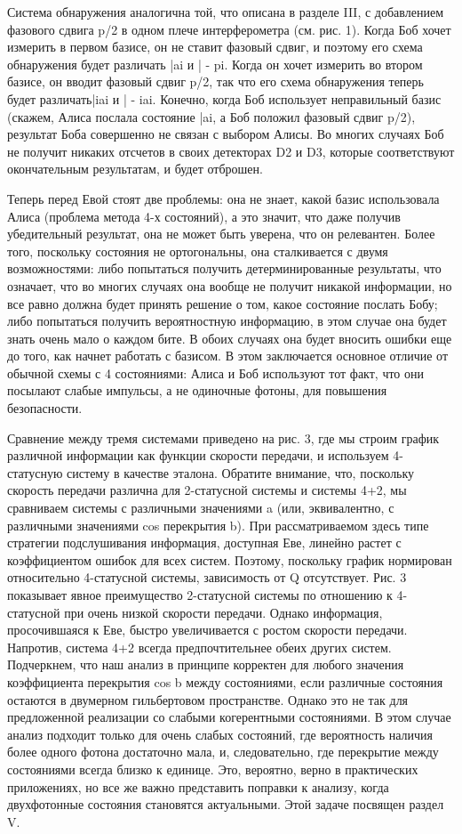 Система обнаружения аналогична той, что описана в разделе III, с добавлением фазового сдвига p/2 в одном плече интерферометра (см. рис. 1). Когда Боб хочет измерить в первом базисе, он не ставит фазовый сдвиг, и поэтому его схема обнаружения будет различать |ai и | - pi. Когда он хочет измерить во втором базисе, он вводит фазовый сдвиг p/2, так что его схема обнаружения теперь будет различать|iai и | - iai. Конечно, когда Боб использует неправильный базис (скажем, Алиса послала состояние |ai, а Боб положил фазовый сдвиг p/2), результат Боба совершенно не связан с выбором Алисы. Во многих случаях Боб не получит никаких отсчетов в своих детекторах D2 и D3, которые соответствуют окончательным результатам, и будет отброшен.

Теперь перед Евой стоят две проблемы: она не знает, какой базис использовала Алиса (проблема метода 4-х состояний), а это значит, что даже получив убедительный результат, она не может быть уверена, что он релевантен. Более того, поскольку состояния не ортогональны, она сталкивается с двумя возможностями: либо попытаться получить детерминированные результаты, что означает, что во многих случаях она вообще не получит никакой информации, но все равно должна будет принять решение о том, какое состояние послать Бобу; либо попытаться получить вероятностную информацию, в этом случае она будет знать очень мало о каждом бите. В обоих случаях она будет вносить ошибки еще до того, как начнет работать с базисом. В этом заключается основное отличие от обычной схемы с 4 состояниями: Алиса и Боб используют тот факт, что они посылают слабые импульсы, а не одиночные фотоны, для повышения безопасности.

Сравнение между тремя системами приведено на рис. 3, где мы строим график различной информации как функции скорости передачи, и используем 4-статусную систему в качестве эталона. Обратите внимание, что, поскольку скорость передачи различна для 2-статусной системы и системы 4+2, мы сравниваем системы с различными значениями a (или, эквивалентно, с различными значениями cos перекрытия b). При рассматриваемом здесь типе стратегии подслушивания информация, доступная Еве, линейно растет с коэффициентом ошибок для всех систем. Поэтому, поскольку график нормирован относительно 4-статусной системы, зависимость от Q отсутствует. Рис. 3 показывает явное преимущество 2-статусной системы по отношению к 4-статусной при очень низкой скорости передачи. Однако информация, просочившаяся к Еве, быстро увеличивается с ростом скорости передачи. Напротив, система 4+2 всегда предпочтительнее обеих других систем. Подчеркнем, что наш анализ в принципе корректен для любого значения коэффициента перекрытия cos b между состояниями, если различные состояния остаются в двумерном гильбертовом пространстве. Однако это не так для предложенной реализации со слабыми когерентными состояниями. В этом случае анализ подходит только для очень слабых состояний, где вероятность наличия более одного фотона достаточно мала, и, следовательно, где перекрытие между состояниями всегда близко к единице. Это, вероятно, верно в практических приложениях, но все же важно представить поправки к анализу, когда двухфотонные состояния становятся актуальными. Этой задаче посвящен раздел V.

